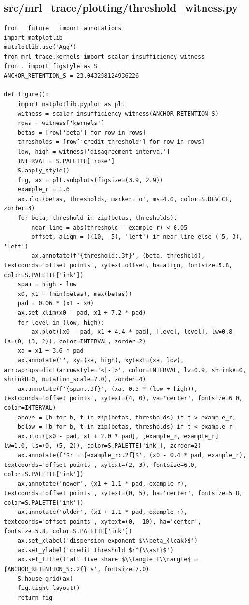 \documentclass[a4paper,10pt]{article}
\begin{document}
\subsection{src/mrl\_trace/plotting/threshold\_witness.py}
\begin{Verbatim}
from __future__ import annotations
import matplotlib
matplotlib.use('Agg')
from mrl_trace.kernels import scalar_insufficiency_witness
from . import figstyle as S
ANCHOR_RETENTION_S = 23.043258124936226

def figure():
    import matplotlib.pyplot as plt
    witness = scalar_insufficiency_witness(ANCHOR_RETENTION_S)
    rows = witness['kernels']
    betas = [row['beta'] for row in rows]
    thresholds = [row['credit_threshold'] for row in rows]
    low, high = witness['disagreement_interval']
    INTERVAL = S.PALETTE['rose']
    S.apply_style()
    fig, ax = plt.subplots(figsize=(3.9, 2.9))
    example_r = 1.6
    ax.plot(betas, thresholds, marker='o', ms=4.0, color=S.DEVICE, zorder=3)
    for beta, threshold in zip(betas, thresholds):
        near_line = abs(threshold - example_r) < 0.05
        offset, align = ((10, -5), 'left') if near_line else ((5, 3), 'left')
        ax.annotate(f'{threshold:.3f}', (beta, threshold), textcoords='offset points', xytext=offset, ha=align, fontsize=5.8, color=S.PALETTE['ink'])
    span = high - low
    x0, x1 = (min(betas), max(betas))
    pad = 0.06 * (x1 - x0)
    ax.set_xlim(x0 - pad, x1 + 7.2 * pad)
    for level in (low, high):
        ax.plot([x0 - pad, x1 + 4.4 * pad], [level, level], lw=0.8, ls=(0, (3, 2)), color=INTERVAL, zorder=2)
    xa = x1 + 3.6 * pad
    ax.annotate('', xy=(xa, high), xytext=(xa, low), arrowprops=dict(arrowstyle='<|-|>', color=INTERVAL, lw=0.9, shrinkA=0, shrinkB=0, mutation_scale=7.0), zorder=4)
    ax.annotate(f'{span:.3f}', (xa, 0.5 * (low + high)), textcoords='offset points', xytext=(4, 0), va='center', fontsize=6.0, color=INTERVAL)
    above = [b for b, t in zip(betas, thresholds) if t > example_r]
    below = [b for b, t in zip(betas, thresholds) if t < example_r]
    ax.plot([x0 - pad, x1 + 2.0 * pad], [example_r, example_r], lw=1.0, ls=(0, (5, 2)), color=S.PALETTE['ink'], zorder=2)
    ax.annotate(f'$r = {example_r:.2f}$', (x0 - 0.4 * pad, example_r), textcoords='offset points', xytext=(2, 3), fontsize=6.0, color=S.PALETTE['ink'])
    ax.annotate('newer', (x1 + 1.1 * pad, example_r), textcoords='offset points', xytext=(0, 5), ha='center', fontsize=5.8, color=S.PALETTE['ink'])
    ax.annotate('older', (x1 + 1.1 * pad, example_r), textcoords='offset points', xytext=(0, -10), ha='center', fontsize=5.8, color=S.PALETTE['ink'])
    ax.set_xlabel('dispersion exponent $\\beta_{leak}$')
    ax.set_ylabel('credit threshold $r^{\\ast}$')
    ax.set_title(f'all five share $\\langle t\\rangle$ = {ANCHOR_RETENTION_S:.2f} s', fontsize=7.0)
    S.house_grid(ax)
    fig.tight_layout()
    return fig
\end{Verbatim}
\end{document}
